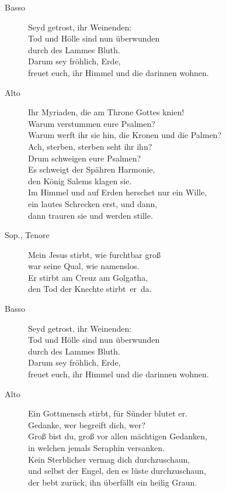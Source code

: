 \documentclass[parskip=full]{scrreprt}
\begin{document}
\begin{description}
  \item[Basso]
  Seyd getrost, ihr Weinenden:\\
  Tod und Hölle sind nun überwunden\\
  durch des Lammes Bluth.\\
  Darum sey fröhlich, Erde,\\
  freuet euch, ihr Himmel und die darinnen wohnen.

  \item[Alto]
  Ihr Myriaden, die am Throne Gottes knien!\\
  Warum verstummen eure Psalmen?\\
  Warum werft ihr sie hin, die Kronen und die Palmen?\\
  Ach, sterben, sterben seht ihr ihn?\\
  Drum schweigen eure Psalmen?\\
  Es schweigt der Spähren Harmonie,\\
  den König Salems klagen sie.\\
  Im Himmel und auf Erden herschet nur ein Wille,\\
  ein lautes Schrecken erst, und dann,\\
  dann trauren sie und werden stille.

  \item[Sop., Tenore]
  Mein Jesus stirbt, wie furchtbar groß\\
  war seine Qual, wie namenslos.\\
  Er stirbt am Creuz am Golgatha,\\
  den Tod der Knechte stirbt er da.

  \item[Basso]
  Seyd getrost, ihr Weinenden:\\
  Tod und Hölle sind nun überwunden\\
  durch des Lammes Bluth.\\
  Darum sey fröhlich, Erde,\\
  freuet euch, ihr Himmel und die darinnen wohnen.

  \item[Alto]
  Ein Gottmensch stirbt, für Sünder blutet er.\\
  Gedanke, wer begreift dich, wer?\\
  Groß bist du, groß vor allen mächtigen Gedanken,\\
  in welchen jemals Seraphin versanken.\\
  Kein Sterblicher vermag dich durchzuschaun,\\
  und selbst der Engel, den es lüste durchzuschaun,\\
  der bebt zurück, ihn überfällt ein heilig Graun.


\end{description}
\end{document}
